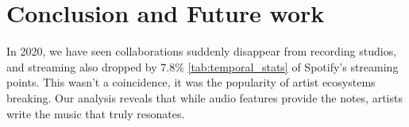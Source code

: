 \documentclass{article}
\begin{document}

\vspace{-4pt}
\section{Conclusion and Future work}

In 2020, we have seen collaborations suddenly disappear from recording studios, and streaming also dropped by 7.8\% \ref{tab:temporal_stats} of Spotify's streaming points. This wasn't a coincidence, it was the popularity of artist ecosystems breaking. Our analysis reveals that while audio features provide the notes, artists write the music that truly resonates.
\end{document}
